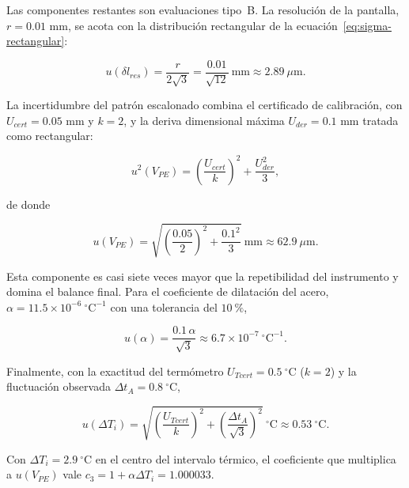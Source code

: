 Las componentes restantes son evaluaciones tipo~B. La resolución de la pantalla,
$r = 0.01$ mm, se acota con la distribución rectangular de la
ecuación~\eqref{eq:sigma-rectangular}:

\begin{equation}
  u(\delta l_{res}) = \frac{r}{2\sqrt{3}} = \frac{0.01}{\sqrt{12}}\ \text{mm}
  \approx 2.89\ \mu\text{m}.
  \label{eq:ut-sigma-res}
\end{equation}

La incertidumbre del patrón escalonado combina el certificado de calibración, con
$U_{cert} = 0.05$ mm y $k = 2$, y la deriva dimensional máxima
$U_{der} = 0.1$ mm tratada como rectangular:

\begin{equation}
  u^2(V_{PE}) = \left(\frac{U_{cert}}{k}\right)^2
  + \frac{U_{der}^2}{3},
  \label{eq:ut-sigma-PE}
\end{equation}

de donde

\begin{equation}
  u(V_{PE}) = \sqrt{\left(\frac{0.05}{2}\right)^2 + \frac{0.1^2}{3}}\ \text{mm}
  \approx 62.9\ \mu\text{m}.
  \label{eq:ut-sigma-PE-valor}
\end{equation}

Esta componente es casi siete veces mayor que la repetibilidad del instrumento y
domina el balance final. Para el coeficiente de dilatación del acero,
$\alpha = 11.5\times10^{-6}\ ^\circ\text{C}^{-1}$ con una tolerancia del $10\ \%$,

\begin{equation}
  u(\alpha) = \frac{0.1\,\alpha}{\sqrt{3}}
  \approx 6.7\times10^{-7}\ ^\circ\text{C}^{-1}.
  \label{eq:ut-sigma-alpha}
\end{equation}

Finalmente, con la exactitud del termómetro $U_{Tcert} = 0.5\ ^\circ\text{C}$
($k = 2$) y la fluctuación observada $\Delta t_A = 0.8\ ^\circ\text{C}$,

\begin{equation}
  u(\Delta T_i) = \sqrt{\left(\frac{U_{Tcert}}{k}\right)^2
  + \left(\frac{\Delta t_A}{\sqrt{3}}\right)^2}\ ^\circ\text{C}
  \approx 0.53\ ^\circ\text{C}.
  \label{eq:ut-sigma-dT}
\end{equation}

Con $\Delta T_i = 2.9\ ^\circ\text{C}$ en el centro del intervalo térmico, el
coeficiente que multiplica a $u(V_{PE})$ vale
$c_3 = 1 + \alpha\Delta T_i = 1.000033$.


